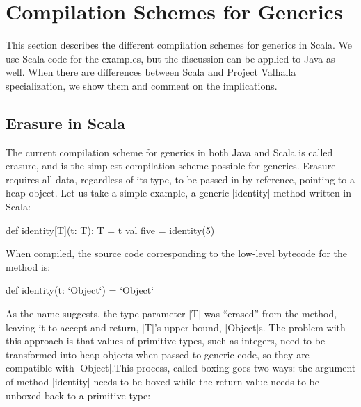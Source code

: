 \section{Compilation Schemes for Generics}
\label{sec:minibox}

This section describes the different compilation schemes for generics in Scala. We use Scala code for the examples, but the discussion can be applied to Java as well. When there are differences between Scala and Project Valhalla specialization, we show them and comment on the implications.

\subsection{Erasure in Scala}


The current compilation scheme for generics in both Java and Scala is called erasure, and is the simplest compilation scheme possible for generics. Erasure requires all data, regardless of its type, to be passed in by reference, pointing to a heap object. Let us take a simple example, a generic |identity| method written in Scala:

\begin{lstlisting-nobreak}
 def identity[T](t: T): T = t
 val five = identity(5)
\end{lstlisting-nobreak}

When compiled, the source code corresponding to the low-level bytecode for the method is:

\begin{lstlisting-nobreak}
 def identity(t: `Object`) = `Object`
\end{lstlisting-nobreak}

As the name suggests, the type parameter |T| was ``erased'' from the method, leaving it to accept and return, |T|'s upper bound, |Object|s. The problem with this approach is that values of primitive types, such as integers, need to be transformed into heap objects when passed to generic code, so they are compatible with |Object|.This process, called boxing goes two ways: the argument of method |identity| needs to be boxed while the return value needs to be unboxed back to a primitive type:

